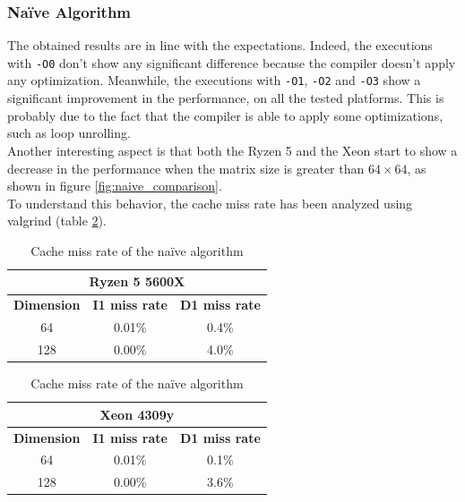 \documentclass{article}
\begin{document}
\subsubsection{Na\"{i}ve Algorithm}
The obtained results are in line with the expectations. Indeed, the executions with \texttt{-O0} don't show any significant difference because the compiler 
doesn't apply any optimization. Meanwhile, the executions with \texttt{-O1}, \texttt{-O2} and \texttt{-O3} show a significant improvement in the performance, on all
the tested platforms. This is probably due to the fact that the compiler is able to apply some optimizations, such as loop unrolling. \\
Another interesting aspect is that both the Ryzen 5 and the Xeon start to show a decrease in the performance when the matrix size is greater than $64 \times 64$, 
as shown in figure \ref{fig:naive_comparison}. \\
To understand this behavior, the cache miss rate has been analyzed using valgrind (table \ref{tab:naive_cache_miss}). \\ 
\begin{table}[h]
    \centering
    \begin{tabular}{|c|c|c|}
        \hline
        \multicolumn{3}{|c|}{\textbf{Ryzen 5 5600X}} \\
        \hline
        \textbf{Dimension}            & \textbf{I1 miss rate} & \textbf{D1 miss rate} \\ \hline
        64                   & 0.01\%       & 0.4\%        \\ \hline
        128                  & 0.00\%       & 4.0\%        \\ \hline 
    \end{tabular}
    \hspace{2em}
    \begin{tabular}{|c|c|c|}
        \hline
        \multicolumn{3}{|c|}{\textbf{Xeon 4309y}} \\
        \hline
        \textbf{Dimension}            & \textbf{I1 miss rate} & \textbf{D1 miss rate} \\ \hline
        64                   & 0.01\%       & 0.1\%        \\ \hline
        128                  & 0.00\%       & 3.6\%        \\ \hline 
    \end{tabular}
    \caption{Cache miss rate of the na\"{i}ve algorithm}
    \label{tab:naive_cache_miss}
\end{table}
\end{document}
